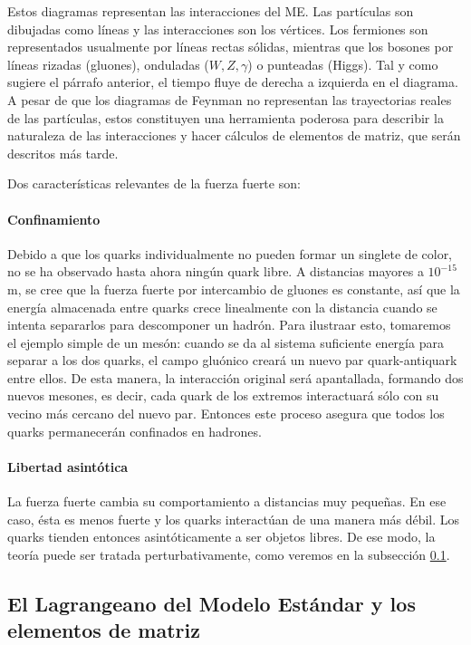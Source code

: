 \documentclass[a4paper,12pt]{article}
\begin{document}
Estos diagramas representan las interacciones del ME. Las partículas son dibujadas como líneas y las interacciones son los vértices. Los fermiones son representados usualmente por líneas rectas sólidas, mientras que los bosones por líneas rizadas (gluones), onduladas ($W, Z, \gamma$) o punteadas (Higgs). Tal y como sugiere el párrafo anterior, el tiempo fluye de derecha a izquierda en el diagrama. A pesar de que los diagramas de Feynman no representan las trayectorias reales de las partículas, estos constituyen una herramienta poderosa para describir la naturaleza de las interacciones y hacer cálculos de elementos de matriz, que serán descritos más tarde.

Dos características relevantes de la fuerza fuerte son:

\paragraph{Confinamiento} Debido a que los quarks individualmente no pueden formar un singlete de color, no se ha observado hasta ahora ningún quark libre. A distancias mayores a $10^{-15}$ m, se cree que la fuerza fuerte por intercambio de gluones es constante, así que la energía almacenada entre quarks crece linealmente con la distancia cuando se intenta separarlos para descomponer un hadrón. Para ilustraar esto, tomaremos el ejemplo simple de un mesón: cuando se da al sistema suficiente energía para separar a los dos quarks, el campo gluónico creará un nuevo par quark-antiquark entre ellos. De esta manera, la interacción original será apantallada, formando dos nuevos mesones, es decir, cada quark de los extremos interactuará sólo con su vecino más cercano del nuevo par. Entonces este proceso asegura que todos los quarks permanecerán confinados en hadrones.

\paragraph{Libertad asintótica} La fuerza fuerte cambia su comportamiento a distancias muy pequeñas. En ese caso, ésta es menos fuerte y los quarks interactúan de una manera más débil. Los quarks tienden entonces asintóticamente a ser objetos libres. De ese modo, la teoría puede ser tratada perturbativamente, como veremos en la subsección \ref{subsec:QCDLag}.

\subsection{El Lagrangeano del Modelo Estándar y los elementos de matriz}
\label{subsec:QCDLag}
\end{document}
